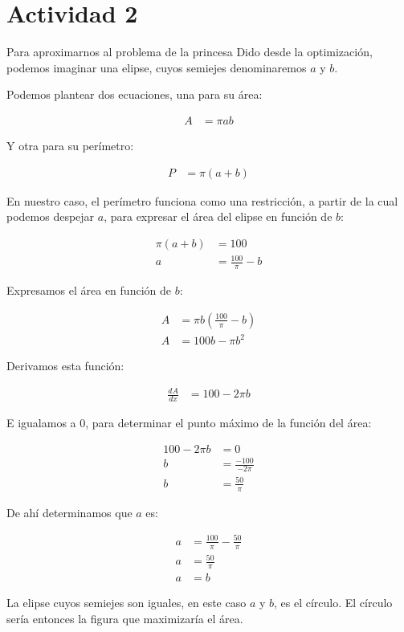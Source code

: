 \section*{Actividad 2}

Para aproximarnos al problema de la princesa Dido desde la optimización, podemos imaginar una elipse, cuyos semiejes denominaremos $a$ y $b$.

\begin{center}
\end{center}

Podemos plantear dos ecuaciones, una para su área:

\begin{align*}
    A &= \pi ab
\end{align*}

Y otra para su perímetro:

\begin{align*}
    P &= \pi (a + b)
\end{align*}

En nuestro caso, el perímetro funciona como una restricción, a partir de la cual podemos despejar $a$, para expresar el área del elipse en función de $b$:

\begin{align*}
    \pi (a + b) &= 100\\
    a &= \frac{100}{\pi} - b
\end{align*}

Expresamos el área en función de $b$:

\begin{align*}
    A &= \pi b (\frac{100}{\pi} - b)\\
    A &= 100b - \pi b^2
\end{align*}

Derivamos esta función:

\begin{align*}
    \frac{dA}{dx} &= 100 - 2 \pi b
\end{align*}

E igualamos a 0, para determinar el punto máximo de la función del área:

\begin{align*}
    100 - 2 \pi b &= 0\\
    b &= \frac{-100}{-2 \pi}\\
    b &= \frac{50}{\pi}
\end{align*}

De ahí determinamos que $a$ es: 

\begin{align*}
    a &= \frac{100}{\pi} - \frac{50}{\pi}\\
    a &= \frac{50}{\pi}\\
    a &= b
\end{align*}

La elipse cuyos semiejes son iguales, en este caso $a$ y $b$, es el círculo. El círculo sería entonces la figura que maximizaría el área.
